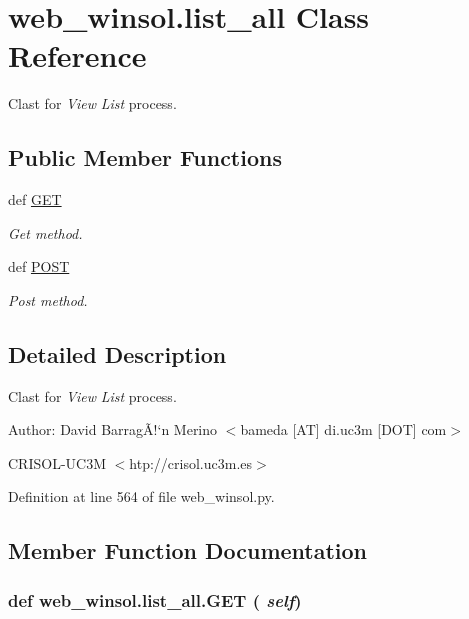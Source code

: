 \hypertarget{classweb__winsol_1_1list__all}{
\section{web\_\-winsol.list\_\-all Class Reference}
\label{classweb__winsol_1_1list__all}
}
Clast for {\em View\/} {\em List\/} process.  


\subsection*{Public Member Functions}
\begin{CompactItemize}
\item 
def \hyperlink{classweb__winsol_1_1list__all_9a31a49384fec629d446fed795d589f2}{GET}
\begin{CompactList}\small\item\em Get method. \item\end{CompactList}\item 
def \hyperlink{classweb__winsol_1_1list__all_bc9054db27eade291e6144f52157e6b4}{POST}
\begin{CompactList}\small\item\em Post method. \item\end{CompactList}\end{CompactItemize}


\subsection{Detailed Description}
Clast for {\em View\/} {\em List\/} process. 

\begin{Desc}
\item[Author:]David Barrag\~{A}!`n Merino $<$bameda \mbox{[}AT\mbox{]} di.uc3m \mbox{[}DOT\mbox{]} com$>$ 

CRISOL-UC3M $<$htp://crisol.uc3m.es$>$ \end{Desc}




Definition at line 564 of file web\_\-winsol.py.

\subsection{Member Function Documentation}
\hypertarget{classweb__winsol_1_1list__all_9a31a49384fec629d446fed795d589f2}{
\subsubsection[GET]{\setlength{\rightskip}{0pt plus 5cm}def web\_\-winsol.list\_\-all.GET ( {\em self})}}
\label{classweb__winsol_1_1list__all_9a31a49384fec629d446fed795d589f2}


